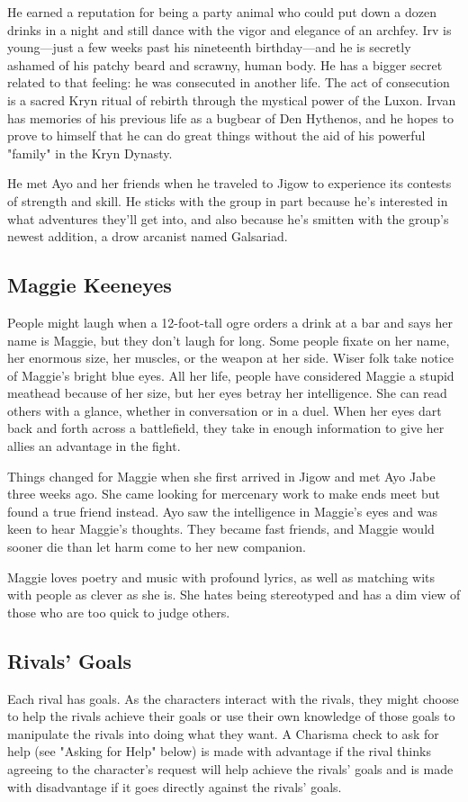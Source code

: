 \documentclass[10pt,a4paper,twoside,bg=print,twocolumn,openany,nodeprecatedcode]{dndbook}
\begin{document}
He earned a reputation for being a party animal who could put down a dozen drinks in a night and still dance with the vigor and elegance of an archfey. Irv is young—just a few weeks past his nineteenth birthday—and he is secretly ashamed of his patchy beard and scrawny, human body. He has a bigger secret related to that feeling: he was consecuted in another life. The act of consecution is a sacred Kryn ritual of rebirth through the mystical power of the Luxon. Irvan has memories of his previous life as a bugbear of Den Hythenos, and he hopes to prove to himself that he can do great things without the aid of his powerful "family" in the Kryn Dynasty.

He met Ayo and her friends when he traveled to Jigow to experience its contests of strength and skill. He sticks with the group in part because he's interested in what adventures they'll get into, and also because he's smitten with the group's newest addition, a drow arcanist named Galsariad.

\subsection{Maggie Keeneyes}
People might laugh when a 12-foot-tall ogre orders a drink at a bar and says her name is Maggie, but they don't laugh for long. Some people fixate on her name, her enormous size, her muscles, or the weapon at her side. Wiser folk take notice of Maggie's bright blue eyes. All her life, people have considered Maggie a stupid meathead because of her size, but her eyes betray her intelligence. She can read others with a glance, whether in conversation or in a duel. When her eyes dart back and forth across a battlefield, they take in enough information to give her allies an advantage in the fight.

Things changed for Maggie when she first arrived in Jigow and met Ayo Jabe three weeks ago. She came looking for mercenary work to make ends meet but found a true friend instead. Ayo saw the intelligence in Maggie's eyes and was keen to hear Maggie's thoughts. They became fast friends, and Maggie would sooner die than let harm come to her new companion.

Maggie loves poetry and music with profound lyrics, as well as matching wits with people as clever as she is. She hates being stereotyped and has a dim view of those who are too quick to judge others.

\subsection{Rivals' Goals}
Each rival has goals. As the characters interact with the rivals, they might choose to help the rivals achieve their goals or use their own knowledge of those goals to manipulate the rivals into doing what they want. A Charisma check to ask for help (see "Asking for Help" below) is made with advantage if the rival thinks agreeing to the character's request will help achieve the rivals' goals and is made with disadvantage if it goes directly against the rivals' goals.
\end{document}
